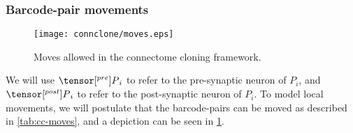 \documentclass[../dissertation.tex]{subfiles}
\begin{document}
\subsubsection{Barcode-pair movements}

\begin{figure}[ht]
    \centering
    \texttt{[image: connclone/moves.eps]}
    \caption{Moves allowed in the connectome cloning framework.}
    \label{fig:cc-moves}
\end{figure}

We will use $\tensor[^{pre}]{P}{_i}$ to refer to the pre-synaptic neuron of $P_i$, and $\tensor[^{post}]{P}{_i}$ to refer to the post-synaptic neuron of $P_i$.
To model local movements, we will postulate that the barcode-pairs can be moved as described in \cref{tab:cc-moves}, and a depiction can be seen in \cref{fig:cc-moves}.
\end{document}
